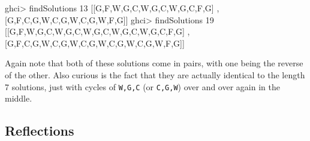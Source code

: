 \documentclass[]{article}
\newenvironment{Shaded}{}{}
\newcommand{\DataTypeTok}[1]{\textcolor[rgb]{0.56,0.13,0.00}{{#1}}}
\newcommand{\DecValTok}[1]{\textcolor[rgb]{0.25,0.63,0.44}{{#1}}}
\newcommand{\FunctionTok}[1]{\textcolor[rgb]{0.02,0.16,0.49}{{#1}}}
\newcommand{\NormalTok}[1]{{#1}}
\begin{document}
\begin{Shaded}
\begin{Highlighting}[]
\NormalTok{ghci}\FunctionTok{>} \NormalTok{findSolutions }\DecValTok{13}
\NormalTok{[[}\DataTypeTok{G}\NormalTok{,}\DataTypeTok{F}\NormalTok{,}\DataTypeTok{W}\NormalTok{,}\DataTypeTok{G}\NormalTok{,}\DataTypeTok{C}\NormalTok{,}\DataTypeTok{W}\NormalTok{,}\DataTypeTok{G}\NormalTok{,}\DataTypeTok{C}\NormalTok{,}\DataTypeTok{W}\NormalTok{,}\DataTypeTok{G}\NormalTok{,}\DataTypeTok{C}\NormalTok{,}\DataTypeTok{F}\NormalTok{,}\DataTypeTok{G}\NormalTok{]}
\NormalTok{,[}\DataTypeTok{G}\NormalTok{,}\DataTypeTok{F}\NormalTok{,}\DataTypeTok{C}\NormalTok{,}\DataTypeTok{G}\NormalTok{,}\DataTypeTok{W}\NormalTok{,}\DataTypeTok{C}\NormalTok{,}\DataTypeTok{G}\NormalTok{,}\DataTypeTok{W}\NormalTok{,}\DataTypeTok{C}\NormalTok{,}\DataTypeTok{G}\NormalTok{,}\DataTypeTok{W}\NormalTok{,}\DataTypeTok{F}\NormalTok{,}\DataTypeTok{G}\NormalTok{]]}
\NormalTok{ghci}\FunctionTok{>} \NormalTok{findSolutions }\DecValTok{19}
\NormalTok{[[}\DataTypeTok{G}\NormalTok{,}\DataTypeTok{F}\NormalTok{,}\DataTypeTok{W}\NormalTok{,}\DataTypeTok{G}\NormalTok{,}\DataTypeTok{C}\NormalTok{,}\DataTypeTok{W}\NormalTok{,}\DataTypeTok{G}\NormalTok{,}\DataTypeTok{C}\NormalTok{,}\DataTypeTok{W}\NormalTok{,}\DataTypeTok{G}\NormalTok{,}\DataTypeTok{C}\NormalTok{,}\DataTypeTok{W}\NormalTok{,}\DataTypeTok{G}\NormalTok{,}\DataTypeTok{C}\NormalTok{,}\DataTypeTok{W}\NormalTok{,}\DataTypeTok{G}\NormalTok{,}\DataTypeTok{C}\NormalTok{,}\DataTypeTok{F}\NormalTok{,}\DataTypeTok{G}\NormalTok{]}
\NormalTok{,[}\DataTypeTok{G}\NormalTok{,}\DataTypeTok{F}\NormalTok{,}\DataTypeTok{C}\NormalTok{,}\DataTypeTok{G}\NormalTok{,}\DataTypeTok{W}\NormalTok{,}\DataTypeTok{C}\NormalTok{,}\DataTypeTok{G}\NormalTok{,}\DataTypeTok{W}\NormalTok{,}\DataTypeTok{C}\NormalTok{,}\DataTypeTok{G}\NormalTok{,}\DataTypeTok{W}\NormalTok{,}\DataTypeTok{C}\NormalTok{,}\DataTypeTok{G}\NormalTok{,}\DataTypeTok{W}\NormalTok{,}\DataTypeTok{C}\NormalTok{,}\DataTypeTok{G}\NormalTok{,}\DataTypeTok{W}\NormalTok{,}\DataTypeTok{F}\NormalTok{,}\DataTypeTok{G}\NormalTok{]]}
\end{Highlighting}
\end{Shaded}

Again note that both of these solutions come in pairs, with one being the
reverse of the other. Also curious is the fact that they are actually identical
to the length 7 solutions, just with cycles of \texttt{W,G,C} (or
\texttt{C,G,W}) over and over again in the middle.

\subsection{Reflections}\label{reflections}
\end{document}
